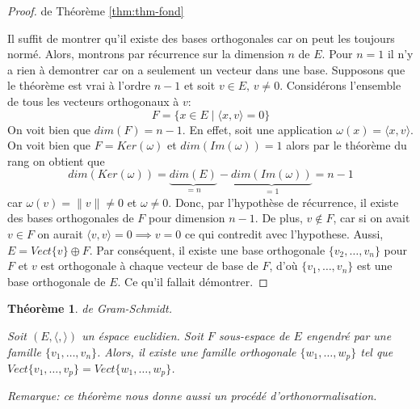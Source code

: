 \documentclass[a4paper]{article}
\newtheorem{theoreme}{Théorème}[section]
\newcommand{\scalair}[1]{\langle #1 \rangle}
\begin{document}
\begin{proof} de {Théorème \ref{thm:thm-fond}}\par
   Il suffit de montrer qu'il existe des bases orthogonales car on peut les toujours normé. Alors, montrons par récurrence sur la dimension $n$ de  $E$. Pour  $n = 1$ il n'y a rien à demontrer car on a seulement un vecteur dans une base. Supposons que le théorème est vrai à l'ordre  $n - 1$ et soit  $v \in E, \, v \neq 0$. Considérons l'ensemble de tous les vecteurs orthogonaux à $v$:
   \[
       F = \{x \in E \mid \scalair{x, v} = 0\}
   \] 
   On voit bien que $dim(F) = n - 1$. En effet, soit  une application $\omega(x) = \scalair{x, v}$. On voit bien que  $F = Ker(\omega)$ et  $dim(Im(\omega)) = 1$ alors par le théorème du rang on obtient que  
   \[
       dim(Ker(\omega)) = \underbrace{dim(E)}_{= n} - \underbrace{dim(Im(\omega))}_{= 1} = n - 1
   \] 
   car $\omega(v) = \|v\| \neq 0$ et $\omega \neq 0$. Donc, par l'hypothèse de récurrence, il existe des bases orthogonales de $F$ pour dimension  $n - 1$. De plus,  $v \not\in F$, car si on avait  $v \in F$ on aurait  $\scalair{v, v} = 0 \implies v = 0$ ce qui contredit avec l'hypothese. Aussi, $E = Vect\{v\} \oplus F$. Par conséquent, il existe une base orthogonale $\{v_2, \ldots, v_n\}$ pour $F$ et  $v$ est orthogonale  à chaque vecteur de base de $F$, d'où  $\{v_1, \ldots, v_n\}$ est une base orthogonale de $E$. Ce qu'il fallait démontrer. 
\end{proof}
\begin{theoreme}\label{thm:gram-schmidt}
   de Gram-Schmidt.\par 
   Soit $(E, \scalair{,})$ un éspace euclidien. Soit  $F$ sous-espace de  $E$ engendré par une famille  $\{v_1, \ldots, v_n\}$. Alors, il existe une famille orthogonale $\{w_1, \ldots, w_p\}$ tel que $Vect\{v_1, \ldots, v_p\} = Vect\{w_1, \ldots, w_p\}$.
   \par Remarque: ce théorème nous donne aussi un procédé d'orthonormalisation.
\end{theoreme}
\end{document}
